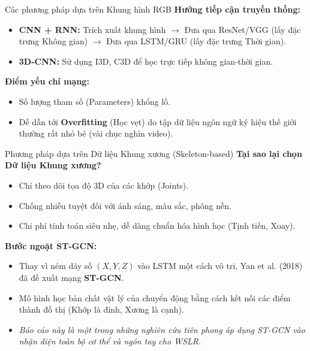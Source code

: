 \documentclass[aspectratio=169]{beamer}
\begin{document}
\begin{frame}{Các phương pháp dựa trên Khung hình RGB}
    \textbf{Hướng tiếp cận truyền thống:}
    \begin{itemize}
        \item \textbf{CNN + RNN:} Trích xuất khung hình $\to$ Đưa qua ResNet/VGG (lấy đặc trưng Không gian) $\to$ Đưa qua LSTM/GRU (lấy đặc trưng Thời gian).
        \item \textbf{3D-CNN:} Sử dụng I3D, C3D để học trực tiếp không gian-thời gian.
    \end{itemize}
    \vspace{0.3cm}
    \textbf{Điểm yếu chí mạng:}
    \begin{itemize}
        \item Số lượng tham số (Parameters) khổng lồ.
        \item Dễ dẫn tới \textbf{Overfitting} (Học vẹt) do tập dữ liệu ngôn ngữ ký hiệu thế giới thường rất nhỏ bé (vài chục nghìn video).
    \end{itemize}
\end{frame}

\begin{frame}{Phương pháp dựa trên Dữ liệu Khung xương (Skeleton-based)}
    \textbf{Tại sao lại chọn Dữ liệu Khung xương?}
    \begin{itemize}
        \item Chỉ theo dõi tọa độ 3D của các khớp (Joints).
        \item Chống nhiễu tuyệt đối với ánh sáng, màu sắc, phông nền.
        \item Chi phí tính toán siêu nhẹ, dễ dàng chuẩn hóa hình học (Tịnh tiến, Xoay).
    \end{itemize}
    \vspace{0.3cm}
    \textbf{Bước ngoặt ST-GCN:}
    \begin{itemize}
        \item Thay vì ném dãy số $(X,Y,Z)$ vào LSTM một cách vô tri, Yan et al. (2018) đã đề xuất mạng \textbf{ST-GCN}.
        \item Mô hình học bản chất vật lý của chuyển động bằng cách kết nối các điểm thành đồ thị (Khớp là đỉnh, Xương là cạnh).
        \item \textit{Báo cáo này là một trong những nghiên cứu tiên phong áp dụng ST-GCN vào nhận diện toàn bộ cơ thể và ngón tay cho WSLR.}
    \end{itemize}
\end{frame}

\end{document}
